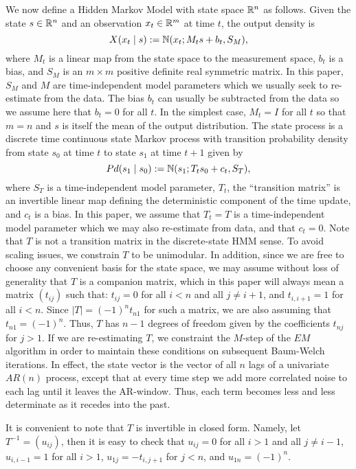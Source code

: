 \documentclass[12pt,leqno]{article}
\begin{document}
We now define a Hidden Markov Model with state space ${\mathbb R}^n$ as follows.  Given the state $s\in{\mathbb R}^n$ and an observation $x_t\in{\mathbb R}^m$ at time $t$, the output density is
$$
X(x_t\mid s) := {\mathbb N}(x_t;M_ts + b_t,S_M),
$$
where $M_t$ is a linear map from the state space to the
measurement space, $b_t$ is a bias, and $S_M$ is an $m\times{m}$ positive definite real symmetric matrix.  In this paper, $S_M$ and $M$ are time-independent model parameters which we usually seek to re-estimate from the data.  The bias $b_t$ can
usually be 
subtracted from the data so we assume here that $b_t = 0$ for all $t$. 
In the simplest case, $M_t = I$ for all $t$ so that $m = n$ and $s$ is itself the mean of the output distribution.  
The state process is a discrete time continuous state Markov process with transition probability density
from state $s_0$ at time $t$ to state $s_1$ at time $t+1$ given by
$$
Pd(s_1\mid s_0) :=  {\mathbb N}(s_1;T_ts_0+c_t,S_T),
$$
where $S_T$ is a time-independent model parameter, $T_t$, the ``transition matrix'' is an invertible linear map  
defining the deterministic component of the time update, and $c_t$ is a bias.  In this paper, we assume that
$T_t = T$ is a time-independent model parameter which we may
also re-estimate from data, and that $c_t = 0$.  Note that $T$ is not a transition matrix in the
discrete-state HMM sense. To avoid scaling issues, we constrain $T$ to be unimodular.  In addition, since
we are free to choose any convenient basis for the state space,  we may assume without loss of generality
that $T$ is a companion matrix, which in this paper will always mean a matrix $(t_{ij})$ such that:
$t_{ij} = 0$ for all $i < n$ and all $j \neq i+1$, and $t_{i,i+1} = 1$ for all $i < n$.  Since $|T| = (-1)^nt_{n1}$ for
such a matrix, we are also assuming that $t_{n1} = (-1)^n$.  Thus, $T$ has $n-1$ degrees of freedom given by the
coefficients $t_{nj}$ for $j > 1$.  If we are re-estimating $T$, we constraint the $M$-step
of the $EM$ algorithm in order to maintain these conditions on subsequent Baum-Welch iterations.
In effect, the state vector is the vector of all $n$ lags of a univariate $AR(n)$ process, except that
at every time step we add more correlated noise to each lag until it leaves the AR-window. Thus,
each term becomes less and less determinate as it recedes into the past.

It is convenient to note that $T$ is invertible in closed form.  Namely, let $T^{-1} = (u_{ij})$, then
it is easy to check that $u_{ij} = 0$ for all $i > 1$ and all $j\neq i-1$,
$u_{i,i-1} = 1$ for all $i > 1$, $ u_{1j} = -t_{i,j+1}$ for $j < n$, and $u_{1n} = (-1)^n$.   
\end{document}
